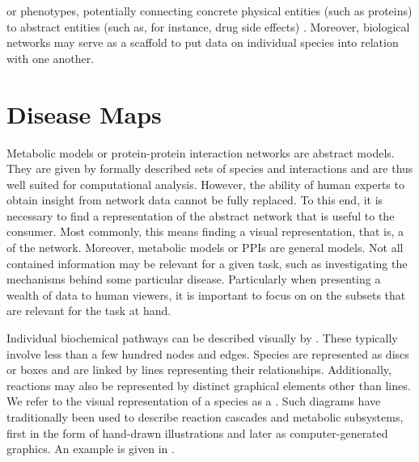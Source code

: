 \documentclass[
	fontsize=10pt, %
	twoside=false, %
	secnumdepth=1, %
  toc=indentunnumbered %
]{kaobook}
\begin{document}
or phenotypes, potentially connecting concrete physical entities (such as
proteins) to abstract entities (such as, for instance, drug side effects)
\cite{ruiz_identification_2021, barabasi_NetworkMedicineNetworkbased_2011}.
Moreover, biological networks
may serve as a scaffold to put data on individual species into relation with one
another.

\section{Disease Maps}


Metabolic models or protein-protein interaction networks are abstract models.
They are given by formally described sets of species and interactions and are
thus well suited for computational analysis. However, the ability of human
experts to obtain insight from network data cannot be fully replaced. To this
end, it is necessary to find a representation of the abstract network that is
useful to the consumer. Most commonly, this means finding a visual
representation, that is, a  of the network. Moreover, metabolic
models or PPIs are general models. Not all contained information may be relevant
for a given task, such as investigating the mechanisms behind some particular
disease. Particularly when presenting a wealth of data to human viewers, it is
important to focus on on the subsets that are relevant for the task at hand.

Individual biochemical pathways can be described visually by . These typically involve less than a few hundred nodes
and edges. Species are represented as discs or boxes and are linked by lines
representing their relationships. Additionally, reactions may also be
represented by distinct graphical elements other than lines. We refer to the
visual representation of a species as a . Such diagrams have
traditionally been used to describe reaction cascades and metabolic subsystems,
first in the form of hand-drawn illustrations and later as computer-generated
graphics. An example is given in .
\end{document}
